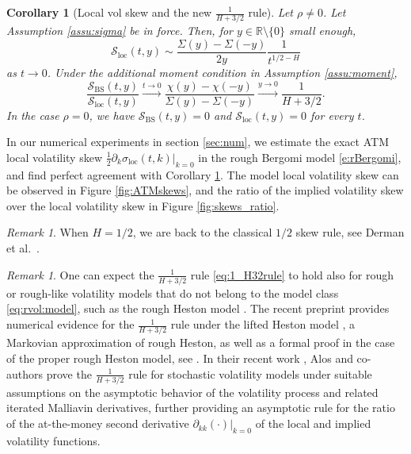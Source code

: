 \documentclass[11pt]{article}
\theoremstyle{plain}
\newtheorem{corollary}[theorem]{Corollary}
\theoremstyle{definition}
\theoremstyle{remark}
\newtheorem{remark}[theorem]{Remark}
\newcommand{\R}{\mathbb{R}}
\newcommand{\1}{\mathbf{1}}
\newcommand{\Sbs}{\mathcal{S}_\mathrm{BS}}
\newcommand{\Sloc}{\mathcal{S}_\mathrm{loc}}
\numberwithin{equation}{section}
\def\sigDup{\sigma_\mathrm{loc}}
\begin{document}
\begin{corollary}[Local vol skew and the new $\frac{1}{H+3/2}$ rule]\label{corollary:Hplus32}
Let $\rho\neq 0$. Let Assumption \ref{assu:sigma} be in force.
Then, for $y\in\R\setminus\{0\}$ small enough,
\begin{equation}\label{eq:ldp:loc:vol:skew}
\Sloc(t, y)
\sim 
\frac{\Sigma(y) - \Sigma(-y)}{2y} \frac 1 {t^{1/2 - H}}
\end{equation}
as $t \to 0$.
Under the additional moment condition in Assumption \ref{assu:moment},
\begin{equation}\label{eq:1_H32rule}
\frac{\Sbs(t, y)}
{\Sloc(t, y)}
\xrightarrow{t\to 0}
\frac{\chi(y) - \chi(-y)}
{\Sigma(y) - \Sigma(-y)}
\xrightarrow{y\to 0}
\frac{1}{H+3/2}.
\end{equation}
In the case $\rho = 0$, we have $\Sbs(t, y) = 0$ and $\Sloc(t, y) = 0$ for every $t$.
\end{corollary}
\noindent In our numerical experiments in section \ref{sec:num}, we estimate the exact ATM local volatility skew $\frac 12 \partial_k \sigDup(t,k)\big|_{k = 0}$ in the rough Bergomi model \eqref{e:rBergomi}, and find perfect agreement with Corollary \ref{corollary:Hplus32}. The model local volatility skew can be observed in Figure \ref{fig:ATMskews}, and the ratio of the implied volatility skew over the local volatility skew in Figure \ref{fig:skews_ratio}.

\begin{remark} \label{rem:one_half_rule}
When $H=1/2$, we are back to the classical $1/2$ skew rule, see 
Derman et al.\ \cite{Derman96}.
\end{remark}

\begin{remark}
One can expect the $\frac{1}{H+3/2}$ rule \eqref{eq:1_H32rule} to hold also for rough or rough-like volatility models that do not belong to the model class \eqref{eq:rvol:model}, such as the rough Heston model \cite{euch2016characteristic}.
The recent preprint \cite{DallAcqua2022} provides numerical evidence for the $\frac{1}{H+3/2}$ rule under the lifted Heston model \cite{AbiJaber2019}, a Markovian approximation of rough Heston, as well as a formal proof in the case of the proper rough Heston model, see \cite[Proposition 2.1]{DallAcqua2022}.
In their recent work \cite{AlosEtAl2022}, Alos and co-authors prove the $\frac{1}{H+3/2}$ rule for stochastic volatility models under suitable assumptions on the asymptotic behavior of the volatility process and related iterated Malliavin derivatives, further providing an asymptotic rule for 
 the ratio of the at-the-money second derivative $\partial_{kk} (\cdot) |_{k=0}$ of the local and implied volatility functions.
\end{remark}
\end{document}
